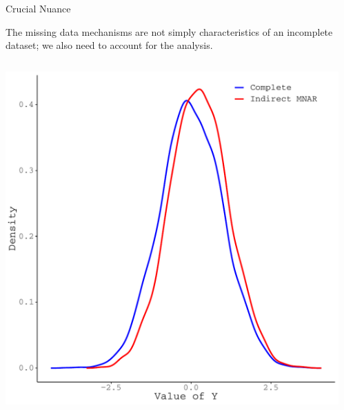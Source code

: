 \documentclass{beamer}\usepackage[]{graphicx}\usepackage[]{color}
\newenvironment{knitrout}{}{} %
\begin{document}
\begin{frame}{Crucial Nuance}
  
  The missing data mechanisms are not simply characteristics of an incomplete 
  dataset; we also need to account for the analysis.
  \vb
  \begin{columns}
    \begin{column}{0.5\textwidth}
      
\begin{knitrout}\footnotesize
{}\color{fgcolor}

{\centering \includegraphics[width=1\linewidth]{figure/intro-unnamed-chunk-18-1} 

}


\end{knitrout}

\end{column}
\begin{column}{0.5\textwidth}
  
\begin{knitrout}\footnotesize
{}\color{fgcolor}


\end{knitrout}
\end{column}
\end{columns}
\end{frame}
\end{document}
